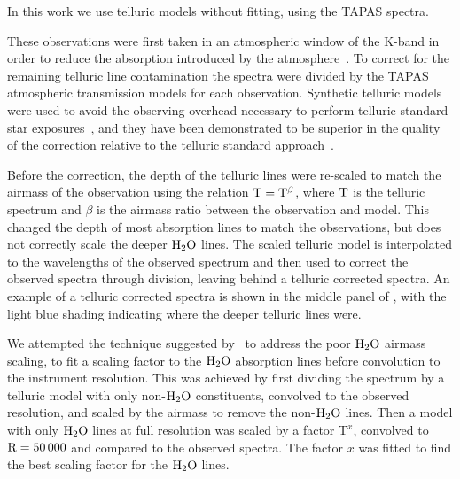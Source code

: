 In this work we use telluric models without fitting, using the TAPAS spectra.

These observations were first taken in an atmospheric window of the K-band in order to reduce the absorption introduced by the atmosphere~\citep{barnes_hd_2008}.
 To correct for the remaining telluric line contamination the spectra were divided by the TAPAS\citep{bertaux_tapas_2014} atmospheric transmission models for each observation. Synthetic telluric models were used to avoid the observing overhead necessary to perform telluric standard star exposures~\citep{vacca_method_2003}, and they have been demonstrated to be superior in the quality of the correction relative to the telluric standard approach~\citep[e.g.][]{cotton_atmospheric_2014}.

Before the correction, the depth of the telluric lines were re-scaled to match the airmass of the observation using the relation \(\rm T = T^{\beta} \), where \(\rm T\) is the telluric spectrum and \(\beta \) is the airmass ratio between the observation and model. This changed the depth of most absorption lines to match the observations, but does not correctly scale the deeper \(\rm H_{2}O \) lines. The scaled telluric model is interpolated to the wavelengths of the observed spectrum and then used to correct the observed spectra through division, leaving behind a telluric corrected spectra. An example of a telluric corrected spectra is shown in the middle panel of , with the light blue shading indicating where the deeper telluric lines were.

We attempted the technique suggested by~\citet{bertaux_tapas_2014} to address the poor \(\rm H_{2}O \) airmass scaling, to fit a scaling factor to the \(\rm {H}_{2}O \) absorption lines before convolution to the instrument resolution. This was achieved by first dividing the spectrum by a telluric model with only non-\(\rm H_{2}O \) constituents, convolved to the observed resolution, and scaled by the airmass to remove the non-\(\rm H_{2}O \) lines. Then a model with only \(\rm H_{2}O \) lines at full resolution was scaled by a factor \(\textrm{T}^{x} \), convolved to \(\rm R=50\,000 \) and compared to the observed spectra. The factor \(x \) was fitted to find the best scaling factor for the \(\rm H_{2}O \) lines.

